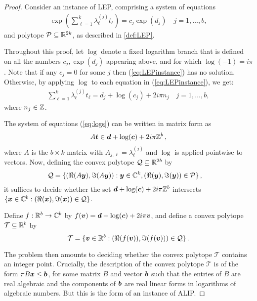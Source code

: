 \begin{proof}
Consider an instance of LEP, comprising a system of equations
\begin{align}
 \exp\left(\sum_{\ell=1}^k \lambda_\ell^{(j)} t_\ell \right) = c_j \exp (d_j)
\quad j=1,\ldots,b,
\label{eq:LEPinstance}
\end{align}
and polytope $\mathcal{P}\subseteq \mathbb{R}^{2k}$, as described in
\cref{def:LEP}.

Throughout this proof, let $\log$ denote a fixed logarithm branch that
is defined on all the numbers $c_j, \exp(d_j)$ appearing
above, and for which $\log(-1) = i \pi$. Note that if any $c_j=0$ for
some $j$ then (\ref{eq:LEPinstance}) has no solution. Otherwise, by
applying $\log$ to each equation in (\ref{eq:LEPinstance}),
we get:
\begin{align}
\sum_{\ell=1}^k \lambda_\ell^{(j)} t_\ell = d_j+\log(c_j) + 2i\pi n_j \quad j=1,\ldots,b,
\label{eq:logs}
\end{align}
where $n_j \in \mathbb{Z}$.

The system of equations (\ref{eq:logs}) can be written in matrix form as
\begin{align*}
A \boldsymbol{t} \in \boldsymbol{d}+\log(\boldsymbol{c}) +
2i\pi \mathbb{Z}^b \, ,
\end{align*}
where $A$ is the $b\times k$ matrix with $A_{j,\ell} = \lambda_\ell^{(j)}$ and $\log$
is applied pointwise to vectors.
Now, defining the convex polytope $\mathcal{Q}\subseteq \mathbb{R}^{2b}$ by
\begin{align*}
\mathcal{Q} = \lbrace &(\Re(A\boldsymbol{y}), \Im(A\boldsymbol{y})) :
\boldsymbol{y}\in\mathbb{C}^k, (\Re(\boldsymbol{y}), \Im(\boldsymbol{y})) \in \mathcal{P} \rbrace \, ,
\end{align*}
it suffices to decide whether the set
$\boldsymbol{d} + \log(\boldsymbol{c})+ 2i\pi  \mathbb{Z}^b$
intersects
$\lbrace \boldsymbol{x} \in \mathbb{C}^b : (\Re(\boldsymbol{x}),
\Im(\boldsymbol{x})) \in \mathcal{Q} \rbrace$.

Define $f:\mathbb{R}^b \rightarrow \mathbb{C}^b$ by
$f(\boldsymbol{v})= \boldsymbol{d} + \log(\boldsymbol{c}) +
2i\pi \boldsymbol{v}$,
and define a convex polytope $\mathcal{T}\subseteq \mathbb{R}^b$ by
\[\mathcal{T}=\{ \boldsymbol{v}\in\mathbb{R}^b : (\Re(f(\boldsymbol{v})),
\Im (f(\boldsymbol{v}))) \in \mathcal{Q} \} \, . \]

The problem then amounts to deciding whether the convex polytope
$\mathcal{T}$ contains an integer point. Crucially, the
description of the convex polytope $\mathcal{T}$ is of the form
$\pi B\boldsymbol{x} \leq \boldsymbol{b}$, for some matrix $B$ and
vector $\boldsymbol{b}$ such that the entries of $B$ are real
algebraic and the components of $\boldsymbol{b}$ are real linear forms
in logarithms of algebraic numbers.  But this is the form of an
instance of ALIP.
\end{proof}

